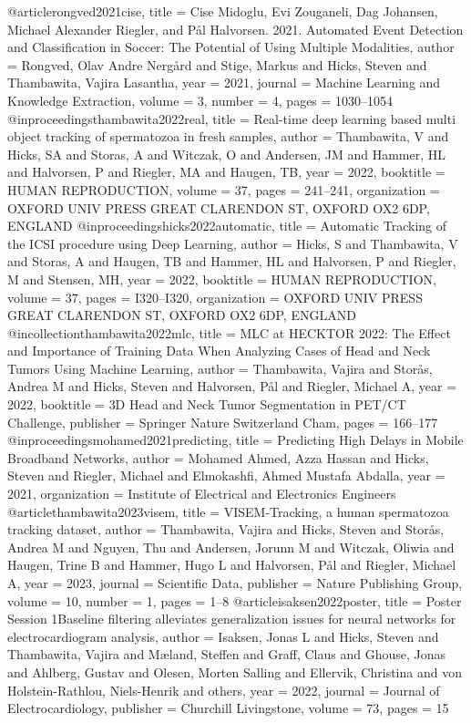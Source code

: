 @article{rongved2021cise,
	title = {Cise Midoglu, Evi Zouganeli, Dag Johansen, Michael Alexander Riegler, and P{\aa}l Halvorsen. 2021. Automated Event Detection and Classification in Soccer: The Potential of Using Multiple Modalities},
	author = {Rongved, Olav Andre Nerg{\aa}rd and Stige, Markus and Hicks, Steven and Thambawita, Vajira Lasantha},
	year = 2021,
	journal = {Machine Learning and Knowledge Extraction},
	volume = 3,
	number = 4,
	pages = {1030--1054}
}
@inproceedings{thambawita2022real,
	title = {Real-time deep learning based multi object tracking of spermatozoa in fresh samples},
	author = {Thambawita, V and Hicks, SA and Storas, A and Witczak, O and Andersen, JM and Hammer, HL and Halvorsen, P and Riegler, MA and Haugen, TB},
	year = 2022,
	booktitle = {HUMAN REPRODUCTION},
	volume = 37,
	pages = {241--241},
	organization = {OXFORD UNIV PRESS GREAT CLARENDON ST, OXFORD OX2 6DP, ENGLAND}
}
@inproceedings{hicks2022automatic,
	title = {Automatic Tracking of the ICSI procedure using Deep Learning},
	author = {Hicks, S and Thambawita, V and Storas, A and Haugen, TB and Hammer, HL and Halvorsen, P and Riegler, M and Stensen, MH},
	year = 2022,
	booktitle = {HUMAN REPRODUCTION},
	volume = 37,
	pages = {I320--I320},
	organization = {OXFORD UNIV PRESS GREAT CLARENDON ST, OXFORD OX2 6DP, ENGLAND}
}
@incollection{thambawita2022mlc,
	title = {MLC at HECKTOR 2022: The Effect and Importance of Training Data When Analyzing Cases of Head and Neck Tumors Using Machine Learning},
	author = {Thambawita, Vajira and Stor{\aa}s, Andrea M and Hicks, Steven and Halvorsen, P{\aa}l and Riegler, Michael A},
	year = 2022,
	booktitle = {3D Head and Neck Tumor Segmentation in PET/CT Challenge},
	publisher = {Springer Nature Switzerland Cham},
	pages = {166--177}
}
@inproceedings{mohamed2021predicting,
	title = {Predicting High Delays in Mobile Broadband Networks},
	author = {Mohamed Ahmed, Azza Hassan and Hicks, Steven and Riegler, Michael and Elmokashfi, Ahmed Mustafa Abdalla},
	year = 2021,
	organization = {Institute of Electrical and Electronics Engineers}
}
@article{thambawita2023visem,
	title = {VISEM-Tracking, a human spermatozoa tracking dataset},
	author = {Thambawita, Vajira and Hicks, Steven and Stor{\aa}s, Andrea M and Nguyen, Thu and Andersen, Jorunn M and Witczak, Oliwia and Haugen, Trine B and Hammer, Hugo L and Halvorsen, P{\aa}l and Riegler, Michael A},
	year = 2023,
	journal = {Scientific Data},
	publisher = {Nature Publishing Group},
	volume = 10,
	number = 1,
	pages = {1--8}
}
@article{isaksen2022poster,
	title = {Poster Session 1Baseline filtering alleviates generalization issues for neural networks for electrocardiogram analysis},
	author = {Isaksen, Jonas L and Hicks, Steven and Thambawita, Vajira and M{\ae}land, Steffen and Graff, Claus and Ghouse, Jonas and Ahlberg, Gustav and Olesen, Morten Salling and Ellervik, Christina and von Holstein-Rathlou, Niels-Henrik and others},
	year = 2022,
	journal = {Journal of Electrocardiology},
	publisher = {Churchill Livingstone},
	volume = 73,
	pages = 15
}
